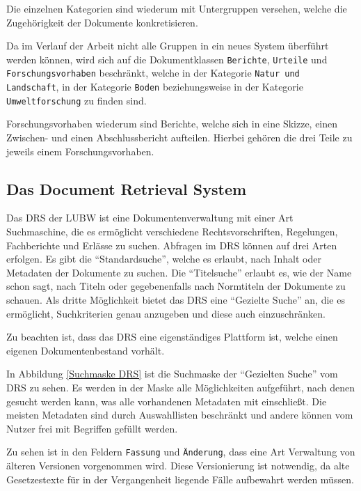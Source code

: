 Die einzelnen Kategorien sind wiederum mit Untergruppen versehen, welche die Zugeh\"origkeit der Dokumente konkretisieren.

Da im Verlauf der Arbeit nicht alle Gruppen in ein neues System \"uberf\"uhrt werden k\"onnen, wird sich auf die Dokumentklassen \texttt{Berichte}, \texttt{Urteile} und \texttt{Forschungsvorhaben} beschr\"ankt, welche in der Kategorie \texttt{Natur und Landschaft}, in der Kategorie \texttt{Boden} beziehungsweise in der Kategorie \texttt{Umweltforschung} zu finden sind.

Forschungsvorhaben wiederum sind Berichte, welche sich in eine Skizze, einen Zwischen- und einen Abschlussbericht aufteilen. Hierbei geh\"oren die drei Teile zu jeweils einem Forschungsvorhaben. \cite{LUBW_FADO}

\subsection{Das Document Retrieval System} \label{DRS}
Das \ac{DRS} der \ac{LUBW} ist eine Dokumentenverwaltung mit einer Art Suchmaschine, die es erm\"oglicht verschiedene Rechtsvorschriften, Regelungen, Fachberichte und Erl\"asse zu suchen. Abfragen im \ac{DRS} k\"onnen auf drei Arten erfolgen. Es gibt die "`Standardsuche"', welche es erlaubt, nach Inhalt oder Metadaten der Dokumente zu suchen. Die "`Titelsuche"' erlaubt es, wie der Name schon sagt, nach Titeln oder gegebenenfalls nach Normtiteln der Dokumente zu schauen. Als dritte M\"oglichkeit bietet das \ac{DRS} eine "`Gezielte Suche"' an, die es erm\"oglicht, Suchkriterien genau anzugeben und diese auch einzuschr\"anken.
\cite{DRS}

Zu beachten ist, dass das \ac{DRS} eine eigenst\"andiges Plattform ist, welche einen eigenen Dokumentenbestand vorh\"alt.

In Abbildung \ref{Suchmaske DRS} ist die Suchmaske der "`Gezielten Suche"' vom \ac{DRS} zu sehen. Es werden in der Maske alle M\"oglichkeiten aufgef\"uhrt, nach denen gesucht werden kann, was alle vorhandenen Metadaten mit einschlie\ss{}t. Die meisten Metadaten sind durch Auswahllisten beschr\"ankt und andere k\"onnen vom Nutzer frei mit Begriffen gef\"ullt werden.

Zu sehen ist in den Feldern \texttt{Fassung} und \texttt{\"Anderung}, dass eine Art Verwaltung von \"alteren Versionen vorgenommen wird. Diese Versionierung ist notwendig, da alte Gesetzestexte f\"ur in der Vergangenheit liegende F\"alle aufbewahrt werden m\"ussen.


